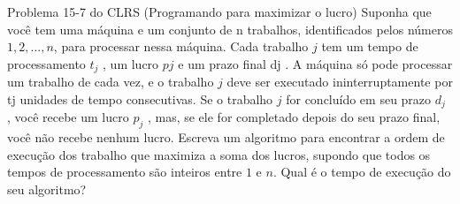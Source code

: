 \documentclass[12pt,a4paper]{article}
\begin{document}
 Problema 15-7 do CLRS (Programando para maximizar o lucro) Suponha
que você tem uma máquina e um conjunto de n trabalhos, identificados pelos
números $1, 2, . . . , n$, para processar nessa máquina. Cada trabalho $j$ tem
um tempo de processamento $t_{j}$ , um lucro $p{j}$ e um prazo final dj . A
máquina só pode processar um trabalho de cada vez, e o trabalho $j$ deve ser
executado ininterruptamente por tj unidades de tempo consecutivas. Se o trabalho
$j$ for concluído em seu prazo $d_{j}$ , você recebe um lucro $p_{j}$ , mas, se
ele for completado depois do seu prazo final, você não recebe nenhum lucro.
Escreva um algoritmo para encontrar a ordem de execução dos trabalho que
maximiza a soma dos lucros, supondo que todos os tempos de processamento são
inteiros entre $1$ e $n$. Qual é o tempo de execução do seu algoritmo?
\end{document}
